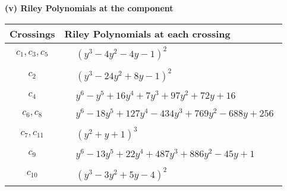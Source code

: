\documentclass[1p]{elsarticle_modified}
\theoremstyle{definition}
\begin{document}
\newpage\renewcommand{\arraystretch}{1}
\flushleft \textbf{(v) Riley Polynomials at the component}\newline \\
\begin{tabular}{m{50pt}|m{274pt}}
Crossings & \hspace{64pt}Riley Polynomials at each crossing \\
\hline $$\begin{aligned}c_{1},c_{3},c_{5}\end{aligned}$$&$\begin{aligned}
&(y^3-4 y^2-4 y-1)^2
\end{aligned}$\\
\hline $$\begin{aligned}c_{2}\end{aligned}$$&$\begin{aligned}
&(y^3-24 y^2+8 y-1)^2
\end{aligned}$\\
\hline $$\begin{aligned}c_{4}\end{aligned}$$&$\begin{aligned}
&y^6- y^5+16 y^4+7 y^3+97 y^2+72 y+16
\end{aligned}$\\
\hline $$\begin{aligned}c_{6},c_{8}\end{aligned}$$&$\begin{aligned}
&y^6-18 y^5+127 y^4-434 y^3+769 y^2-688 y+256
\end{aligned}$\\
\hline $$\begin{aligned}c_{7},c_{11}\end{aligned}$$&$\begin{aligned}
&(y^2+y+1)^3
\end{aligned}$\\
\hline $$\begin{aligned}c_{9}\end{aligned}$$&$\begin{aligned}
&y^6-13 y^5+22 y^4+487 y^3+886 y^2-45 y+1
\end{aligned}$\\
\hline $$\begin{aligned}c_{10}\end{aligned}$$&$\begin{aligned}
&(y^3-3 y^2+5 y-4)^2
\end{aligned}$\\
\hline
\end{tabular}\\~\\
\end{document}
